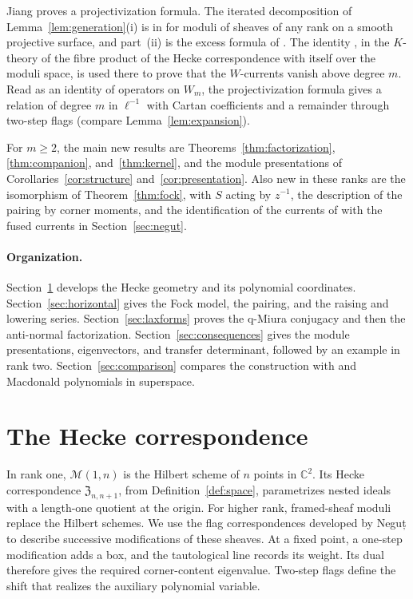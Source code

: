 \documentclass[11pt]{amsart}
\theoremstyle{definition}
\theoremstyle{remark}
\newcommand{\Gies}[2]{\mathcal M(#1,#2)}         %
\newcommand{\Zc}{\mathfrak Z}
\newcommand{\Hecke}[1]{\Zc_{#1,#1+1}}            %
\newcommand{\Wsp}[1]{W_{#1}}                     %
\newcommand{\taut}{\ell}                         %
\newcommand{\Shift}{S}                           %
\newcommand{\Negut}{Neguț}
\begin{document}
Jiang \cite[Corollary~8.15]{Jiang} proves a projectivization formula.
The iterated decomposition of Lemma~\ref{lem:generation}(i) is in
\cite[Proposition~7.7]{JLZ} for moduli of sheaves of any rank on a smooth projective surface, and part~(ii)
is the excess formula of \cite[Propositions~2.27 and~3.4]{N2}. The identity \cite[Lemma~6.2]{Nsurf}, in
the \(K\)-theory of the fibre product of the Hecke correspondence with itself over the moduli space, is
used there to prove that the \(W\)-currents vanish above degree \(m\). Read as an identity of operators on
\(\Wsp{m}\), the projectivization formula gives a relation of degree \(m\) in \(\taut^{-1}\) with Cartan coefficients and a remainder
through two-step flags (compare Lemma~\ref{lem:expansion}).

For \(m\geq2\), the main new results are Theorems~\ref{thm:factorization},
\ref{thm:companion}, and~\ref{thm:kernel}, and the module presentations of
Corollaries~\ref{cor:structure} and~\ref{cor:presentation}.
Also new in these ranks are the isomorphism of Theorem~\ref{thm:fock}, with \(\Shift\)
acting by \(z^{-1}\), the description of the pairing by corner moments, and the
identification of the currents of \cite{N3} with the fused currents in Section~\ref{sec:negut}.


\paragraph{Organization.}
Section~\ref{sec:operator} develops the Hecke geometry and its polynomial coordinates.
Section~\ref{sec:horizontal} gives the Fock model, the pairing, and the raising and lowering series.
Section~\ref{sec:laxforms} proves the q-Miura conjugacy and then the anti-normal factorization.
Section~\ref{sec:consequences} gives the module presentations, eigenvectors, and transfer determinant,
followed by an example in rank two. Section~\ref{sec:comparison} compares the construction with
\cite{M26,GGS,CGM} and Macdonald polynomials in superspace.


\section{The Hecke correspondence}\label{sec:operator}

In rank one, \(\Gies{1}{n}\) is the Hilbert scheme of \(n\) points in \(\mathbb C^2\).
Its Hecke correspondence \(\Hecke{n}\), from Definition~\ref{def:space},
parametrizes nested ideals with a length-one quotient at the origin.
For higher rank, framed-sheaf moduli replace the Hilbert schemes. We use the flag
correspondences developed by \Negut{} \cite{N1,N2} to describe successive modifications of
these sheaves. At a fixed point, a one-step modification adds a box, and the tautological
line records its weight. Its dual therefore gives the required corner-content eigenvalue.
Two-step flags define the shift that realizes the auxiliary polynomial variable.
\end{document}
